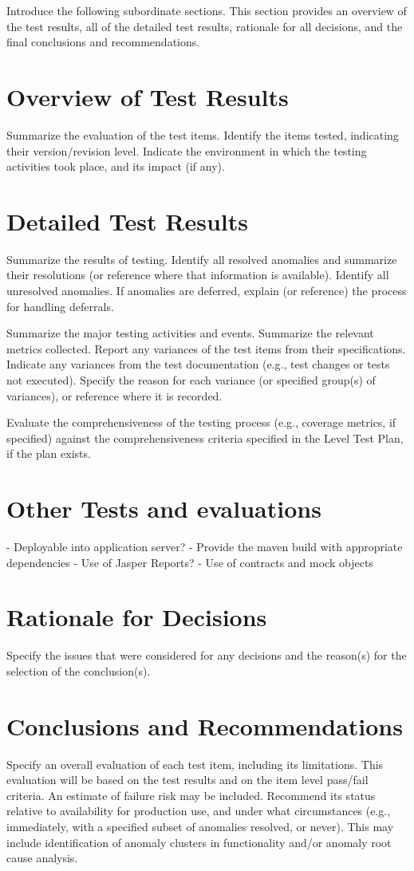Introduce the following subordinate sections. This section provides an overview of the test results, all
of the detailed test results, rationale for all decisions, and the final conclusions and recommendations.

\section{Overview of Test Results}
Summarize the evaluation of the test items. Identify the items tested, indicating their version/revision
level. Indicate the environment in which the testing activities took place, and its impact (if any).

\section{Detailed Test Results}
Summarize the results of testing. Identify all resolved anomalies and summarize their resolutions (or
reference where that information is available). Identify all unresolved anomalies. If anomalies are
deferred, explain (or reference) the process for handling deferrals.\par

Summarize the major testing activities and events. Summarize the relevant metrics collected.
Report any variances of the test items from their specifications. Indicate any variances from the test
documentation (e.g., test changes or tests not executed). Specify the reason for each variance (or
specified group(s) of variances), or reference where it is recorded.\par

Evaluate the comprehensiveness of the testing process (e.g., coverage metrics, if specified) against the
comprehensiveness criteria specified in the Level Test Plan, if the plan exists.

\section{Other Tests and evaluations}
- Deployable into application server?
- Provide the maven build with appropriate dependencies
- Use of Jasper Reports?
- Use of contracts and mock objects

\section{Rationale for Decisions}
Specify the issues that were considered for any decisions and the reason(s) for the selection of the
conclusion(s).

\section{Conclusions and Recommendations}
Specify an overall evaluation of each test item, including its limitations. This evaluation will be based
on the test results and on the item level pass/fail criteria. An estimate of failure risk may be included.
Recommend its status relative to availability for production use, and under what circumstances (e.g.,
immediately, with a specified subset of anomalies resolved, or never). This may include identification
of anomaly clusters in functionality and/or anomaly root cause analysis.
